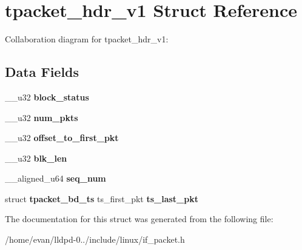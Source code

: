 \section{tpacket\-\_\-hdr\-\_\-v1 \-Struct \-Reference}
\label{structtpacket__hdr__v1}


\-Collaboration diagram for tpacket\-\_\-hdr\-\_\-v1\-:
\subsection*{\-Data \-Fields}
\begin{DoxyCompactItemize}
\item 
\-\_\-\-\_\-u32 {\bfseries block\-\_\-status}\label{structtpacket__hdr__v1_a85e99a9b51f78825d0a503108e3e1889}

\item 
\-\_\-\-\_\-u32 {\bfseries num\-\_\-pkts}\label{structtpacket__hdr__v1_a3a66456b83a75ef87c654db889fa8bf6}

\item 
\-\_\-\-\_\-u32 {\bfseries offset\-\_\-to\-\_\-first\-\_\-pkt}\label{structtpacket__hdr__v1_a7aa03a4c079335eaa6695cee1bb651e6}

\item 
\-\_\-\-\_\-u32 {\bfseries blk\-\_\-len}\label{structtpacket__hdr__v1_aeb6b7bf27cf6edf6c207cab18d91961a}

\item 
\-\_\-\-\_\-aligned\-\_\-u64 {\bfseries seq\-\_\-num}\label{structtpacket__hdr__v1_af2bbb50ca2687f935ef2ab498c50c0cc}

\item 
struct {\bf tpacket\-\_\-bd\-\_\-ts} ts\-\_\-first\-\_\-pkt {\bfseries ts\-\_\-last\-\_\-pkt}\label{structtpacket__hdr__v1_a6bc62a84fcf1ae81836c98cebd172000}

\end{DoxyCompactItemize}


\-The documentation for this struct was generated from the following file\-:\begin{DoxyCompactItemize}
\item 
/home/evan/lldpd-\/0../include/linux/if\-\_\-packet.\-h\end{DoxyCompactItemize}
